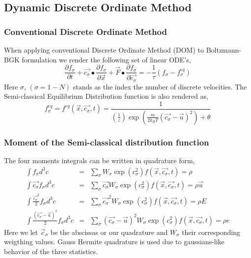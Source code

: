 \documentclass[11pt,fleqn]{beamer}
\begin{document}
\subsection{Dynamic Discrete Ordinate Method}
\begin{frame}
	\frametitle{Conventional Discrete Ordinate Method}
	When applying conventional Discrete Ordinate Method (DOM) to Boltzmann-BGK formulation we render the following set of linear ODE's,
	\begin{equation}
	\frac{\partial{f_\sigma}}{\partial{t}} +
	\vec{c_\sigma}\bullet\frac{\partial{f_\sigma}}{\partial{\vec{x}}} +
	\vec{F}\bullet\frac{\partial{f_\sigma}}{\partial{\vec{c_\sigma}}} = 
	-\frac{1}{\tau}(f_\sigma-f^{eq}_\sigma)
	\end{equation}
Here $\sigma$, $(\sigma = 1-N)$ stands as the index  the number of discrete velocities. The Semi-classical Equilibrium Distribution function is also rendered as,
	\begin{equation}
	f_\sigma^{eq}=f^{eq}(\vec{x},\vec{c_\sigma},t)=\frac{1}{(\frac{1}{z})\exp\left({\frac{m}{2 k_B T}(\vec{c_\sigma}-\vec{u})^2}\right)+\theta}
	\end{equation}
\end{frame}

\begin{frame}
	\frametitle{Moment of the Semi-classical distribution function}
	The four moments integrals can be written in quadrature form, 
	\begin{eqnarray}
	\int f_\sigma d^3 c &=& \sum_\sigma W_\sigma \exp{(c_\sigma^2)} f(\vec{x},\vec{c_\sigma},t) = \rho \\
	\int \vec{c_\sigma} f_\sigma d^3 c &=& \sum_\sigma \vec{c_\sigma} W_\sigma \exp{(c_\sigma^2)} f(\vec{x},\vec{c_\sigma},t) = \rho \vec{u} \nonumber \\
	\int \frac{\vec{c_\sigma}^2}{2} f_\sigma d^3 c &=& \sum_\sigma \vec{c_\sigma}^2 W_\sigma \exp{(c_\sigma^2)} f(\vec{x},\vec{c_\sigma},t) = \rho E \nonumber \\
	\int \frac{(\vec{c_\sigma}-\vec{u})^2}{2} f_\sigma d^3 c &=& \sum_\sigma (\vec{c_\sigma}-\vec{u})^2 W_\sigma \exp{(c_\sigma^2)} f(\vec{x},\vec{c_\sigma},t) = \rho e \nonumber
	\end{eqnarray}
	Here we let $\vec{c}_\sigma$ be the abscissas or our quadrature and $W_\sigma$ their corresponding weigthing values. Gauss Hermite quadrature is used due to gaussians-like behavior of the three statistics.
\end{frame} 
\end{document}
